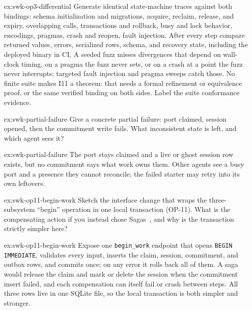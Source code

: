 \documentclass[11pt,a4paper]{article}
\theoremstyle{definition}
\theoremstyle{remark}
\begin{document}
\begin{pdsolution}{ex:swk-op3-differential}
Generate identical state-machine traces against both bindings: schema initialization and migrations, acquire, reclaim, release, and expiry, overlapping calls, transactions and rollback, busy and lock behavior, encodings, pragmas, crash and reopen, fault injection. After every step compare returned values, errors, serialized rows, schema, and recovery state, including the deployed binary in CI. A seeded fuzz misses divergences that depend on wall-clock timing, on a pragma the fuzz never sets, or on a crash at a point the fuzz never interrupts; targeted fault injection and pragma sweeps catch those. No finite suite makes I11 a theorem: that needs a formal refinement or equivalence proof, or the same verified binding on both sides. Label the suite conformance evidence.
\end{pdsolution}


\begin{pdexercise}[kind=Check,rating=1]{ex:swk-partial-failure}
Give a concrete partial failure: port claimed, session opened, then the commitment write fails. What inconsistent state is left, and which agent sees it?
\end{pdexercise}
\begin{pdsolution}{ex:swk-partial-failure}
The port stays claimed and a live or ghost session row exists, but no commitment says what work owns them. Other agents see a busy port and a presence they cannot reconcile; the failed starter may retry into its own leftovers.
\end{pdsolution}
\begin{pdexercise}[kind=Open,rating=3]{ex:swk-op11-begin-work}
Sketch the interface change that wraps the three-subsystem ``begin'' operation in one local transaction (OP-11). What is the compensating action if you instead chose Sagas~, and why is the transaction strictly simpler here?
\end{pdexercise}
\begin{pdsolution}{ex:swk-op11-begin-work}
Expose one \texttt{begin\_work} endpoint that opens \texttt{BEGIN IMMEDIATE}, validates every input, inserts the claim, session, commitment, and outbox rows, and commits once; on any error it rolls back all of them. A saga would release the claim and mark or delete the session when the commitment insert failed, and each compensation can itself fail or crash between steps. All three rows live in one SQLite file, so the local transaction is both simpler and stronger.
\end{pdsolution}
\end{document}
